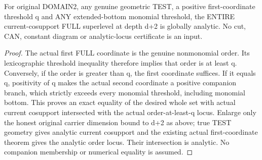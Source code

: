 \begin{theorem}
\label{hir:original-test-positive-monomial-full-superlevels-analytic}
\leanok
For original DOMAIN2, any genuine geometric TEST, a positive first-coordinate
threshold q and ANY extended-bottom monomial threshold, the ENTIRE
current-cosupport FULL superlevel at depth d+2 is globally analytic. No cut,
CAN, constant diagram or analytic-locus certificate is an input.
\end{theorem}
\begin{proof}
The actual first FULL coordinate is the genuine nonmonomial order. Its
lexicographic threshold inequality therefore implies that order is at least q.
Conversely, if the order is greater than q, the first coordinate suffices. If
it equals q, positivity of q makes the actual second coordinate a positive
companion branch, which strictly exceeds every monomial threshold, including
monomial bottom. This proves an exact equality of the desired whole set with
actual current cosupport intersected with the actual order-at-least-q locus.
Enlarge only the honest original carrier dimension bound to d+2 as above;
true TEST geometry gives analytic current cosupport and the existing actual
first-coordinate theorem gives the analytic order locus. Their intersection
is analytic. No companion membership or numerical equality is assumed.
\end{proof}

